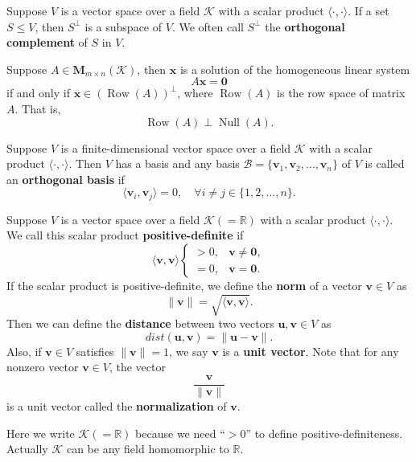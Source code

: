 \documentclass{ctexart}
\begin{document}
	\begin{mypro}
		Suppose $V$ is a vector space over a field $\mathcal{K}$ with a scalar product $\langle \cdot, \cdot \rangle$. If a set $S \le V$, then $S^\perp$ is a subspace of $V$. We often call $S^\perp$ the \textbf{orthogonal complement} of $S$ in $V$.
	\end{mypro}
	\begin{myex}
		Suppose $A\in \mathbf{M}_{m \times n}(\mathcal{K})$, then $\mathbf{x}$ is a solution of the homogeneous linear system
		\[
		A\mathbf{x} = \mathbf{0}
		\]
		if and only if $\mathbf{x} \in (\operatorname{Row}(A))^\perp$, where $\operatorname{Row}(A)$ is the row space of matrix $A$. That is,
		\[
		\operatorname{Row}(A) \perp \operatorname{Null}(A).
		\]
	\end{myex}
	\begin{mydef}
		Suppose $V$ is a finite-dimensional vector space over a field $\mathcal{K}$ with a scalar product $\langle \cdot, \cdot \rangle$. Then $V$ has a basis and any basis $\mathcal{B} = \{\mathbf{v}_1, \mathbf{v}_2, \dots, \mathbf{v}_n\}$ of $V$ is called an \textbf{orthogonal basis} if
		\[
		\langle \mathbf{v}_i, \mathbf{v}_j \rangle = 0, \quad \forall i \neq j\in \{1,2,\ldots,n\}.
		\]

	\end{mydef}
	\begin{mydef}
		Suppose $V$ is a vector space over a field $\mathcal{K\left( =\mathbb{R} \right)}$ with a scalar product $\langle \cdot, \cdot \rangle$. We call this scalar product \textbf{positive-definite} if
		\[
		\langle \mathbf{v}, \mathbf{v} \rangle 
		\begin{cases}
		> 0, & \mathbf{v} \neq \mathbf{0}, \\
		= 0, & \mathbf{v} = \mathbf{0}.
		\end{cases}
		\]
		If the scalar product is positive-definite, we define the \textbf{norm} of a vector $\mathbf{v} \in V$ as
		\[
		\| \mathbf{v} \| = \sqrt{\langle \mathbf{v}, \mathbf{v} \rangle}.
		\]
		Then we can define the \textbf{distance} between two vectors $\mathbf{u}, \mathbf{v} \in V$ as
		\[
		dist(\mathbf{u}, \mathbf{v}) = \| \mathbf{u} - \mathbf{v} \|.
		\]
		Also, if $\mathbf{v} \in V$ satisfies $\| \mathbf{v} \| = 1$, we say $\mathbf{v}$ is a \textbf{unit vector}. Note that for any nonzero vector $\mathbf{v} \in V$, the vector
		\[
		\frac{\mathbf{v}}{\| \mathbf{v} \|}
		\]
		is a unit vector called the \textbf{normalization} of $\mathbf{v}$.
	\end{mydef}
	\begin{myrmk}
		Here we write $\mathcal{K} \left(= \mathbb{R}\right)$ because we need ``$>0$'' to define positive-definiteness. Actually $\mathcal{K}$ can be any field homomorphic to $\mathbb{R}$. 
	\end{myrmk}
\end{document}
